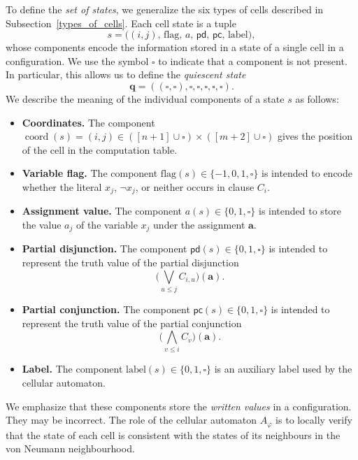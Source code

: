 \documentclass{article}
\theoremstyle{plain}
\theoremstyle{definition}
\DeclareMathOperator{\coord}{coord}
\newcommand{\tuple}{\mathbf}
\begin{document}
To define the \emph{set of states}, we generalize the six types of cells described in
Subsection~\ref{types_of_cells}. Each cell state is a tuple
\[
s = \bigl((i,j),\, \mathrm{flag},\, a,\, \mathsf{pd},\, \mathsf{pc},\, \mathrm{label}\bigr),
\]
whose components encode the information stored in a state of a single cell in a configuration. We use the symbol $\square$ to indicate that a component is not present.
In particular, this allows us to define the \emph{quiescent state}
\[
\tuple q = ((\square, \square), \square, \square, \square, \square, \square).
\]
We describe the meaning of the individual components of a state $s$ as follows:
\begin{itemize}
    \item \textbf{Coordinates.}
    The component $\coord(s)=(i,j)\in ([n+1]\cup \square)\times([m+2]\cup \square)$ gives the position of the cell
    in the computation table.

    \item \textbf{Variable flag.}
    The component $\mathrm{flag}(s)\in\{-1,0,1,\square\}$ is intended to encode whether
    the literal $x_j$, $\neg x_j$, or neither occurs in clause $C_i$.

    \item \textbf{Assignment value.}
    The component $a(s)\in\{0,1,\square\}$ is intended to store the value $a_j$ of the
    variable $x_j$ under the assignment $\tuple a$.

    \item \textbf{Partial disjunction.}
    The component $\mathsf{pd}(s)\in\{0,1,\square\}$ is intended to represent the truth
    value of the partial disjunction
    \[
    \bigl(\bigvee_{u \le j} C_{i,u}\bigr)(\tuple a).
    \]

    \item \textbf{Partial conjunction.}
    The component $\mathsf{pc}(s)\in\{0,1,\square\}$ is intended to represent the truth
    value of the partial conjunction
    \[
    \bigl(\bigwedge_{v \le i} C_v\bigr)(\tuple a).
    \]

    \item \textbf{Label.}
    The component $\mathrm{label}(s)\in\{0,1,\square\}$ is an auxiliary label used by the
    cellular automaton.
\end{itemize}

We emphasize that these components store the \emph{written values} in a configuration.
They may be incorrect. The role of the cellular automaton $A_\varphi$ is to locally verify that the state of
each cell is consistent with the states of its neighbours in the von Neumann
neighbourhood.
\end{document}
